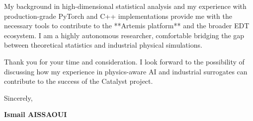 \documentclass[a4paper,12pt]{article}
\begin{document}
My background in high-dimensional statistical analysis and my experience with production-grade PyTorch and C++ implementations provide me with the necessary tools to contribute to the **Artemis platform** and the broader EDT ecosystem. I am a highly autonomous researcher, comfortable bridging the gap between theoretical statistics and industrial physical simulations.

Thank you for your time and consideration. I look forward to the possibility of discussing how my experience in physics-aware AI and industrial surrogates can contribute to the success of the Catalyst project.

Sincerely,

\bigskip

\textbf{Ismail AISSAOUI}
\end{document}

